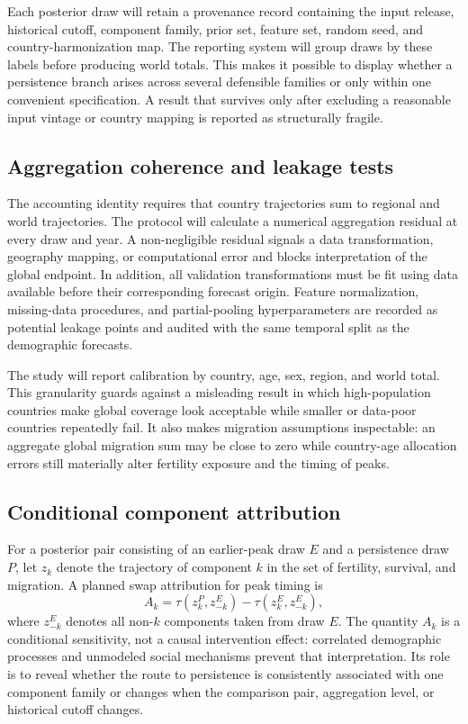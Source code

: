 \documentclass[conference]{IEEEtran}
\begin{document}
Each posterior draw will retain a provenance record containing the input release, historical cutoff, component family, prior set, feature set, random seed, and country-harmonization map. The reporting system will group draws by these labels before producing world totals. This makes it possible to display whether a persistence branch arises across several defensible families or only within one convenient specification. A result that survives only after excluding a reasonable input vintage or country mapping is reported as structurally fragile.

\subsection{Aggregation coherence and leakage tests}

The accounting identity requires that country trajectories sum to regional and world trajectories. The protocol will calculate a numerical aggregation residual at every draw and year. A non-negligible residual signals a data transformation, geography mapping, or computational error and blocks interpretation of the global endpoint. In addition, all validation transformations must be fit using data available before their corresponding forecast origin. Feature normalization, missing-data procedures, and partial-pooling hyperparameters are recorded as potential leakage points and audited with the same temporal split as the demographic forecasts.

The study will report calibration by country, age, sex, region, and world total. This granularity guards against a misleading result in which high-population countries make global coverage look acceptable while smaller or data-poor countries repeatedly fail. It also makes migration assumptions inspectable: an aggregate global migration sum may be close to zero while country-age allocation errors still materially alter fertility exposure and the timing of peaks.

\subsection{Conditional component attribution}

For a posterior pair consisting of an earlier-peak draw $E$ and a persistence draw $P$, let $z_k$ denote the trajectory of component $k$ in the set of fertility, survival, and migration. A planned swap attribution for peak timing is
\begin{equation}
A_k=\tau(z_k^P,z_{-k}^E)-\tau(z_k^E,z_{-k}^E),
\label{eq:attribution}
\end{equation}
where $z_{-k}^E$ denotes all non-$k$ components taken from draw $E$. The quantity $A_k$ is a conditional sensitivity, not a causal intervention effect: correlated demographic processes and unmodeled social mechanisms prevent that interpretation. Its role is to reveal whether the route to persistence is consistently associated with one component family or changes when the comparison pair, aggregation level, or historical cutoff changes.
\end{document}
